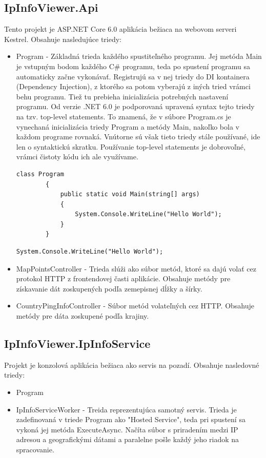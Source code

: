 \subsection{IpInfoViewer.Api}
Tento projekt je ASP.NET Core 6.0 aplikácia bežiaca na webovom serveri Kestrel. Obsahuje nasledujúce triedy: 
\begin{itemize}
    \item Program
    - Základná trieda každého spustiteľného programu. Jej metóda Main je vstupným bodom každého C\# programu, teda po spustení programu sa automaticky 
    začne vykonávať. Registrujú sa v nej triedy do DI kontainera (Dependency Injection), z ktorého sa potom vyberajú z iných tried vrámci behu programu. 
    Tiež tu prebieha inicializácia potrebných nastavení programu. Od verzie .NET 6.0 je podporovaná upravená syntax tejto triedy na tzv. top-level statements. 
    To znamená, že v súbore Program.cs je vynechaná inicializácia triedy Program a metódy Main, nakoľko bola v každom 
    programe rovnaká. Vnútorne sú však tieto triedy stále používané, ide len o syntaktickú skratku. Používanie top-level statements 
    je dobrovoľné, vrámci čistoty kódu ich ale využívame.
    \begin{lstlisting}[language={[Sharp]C},caption={Ukážka kódu triedy Program bez použitia top-level statements},label=alg:Program_Old]
        class Program 
        {
            public static void Main(string[] args) 
            {
                System.Console.WriteLine("Hello World");
            }
        }
    \end{lstlisting}
    \begin{lstlisting}[language={[Sharp]C},caption={Ukážka kódu triedy Program s použitím top-level statements},label=alg:Program_New]
        System.Console.WriteLine("Hello World");
    \end{lstlisting}
    \item MapPointsController
    - Trieda slúži ako súbor metód, ktoré sa dajú volať cez protokol HTTP z frontendovej časti aplikácie. Obsahuje metódy pre získavanie 
    dát zoskupených podľa zemepisnej dĺžky a šírky.
    \item CountryPingInfoController
    - Súbor metód volateľných cez HTTP. Obsahuje metódy pre dáta zoskupené podľa krajiny.
\end{itemize}
\subsection{IpInfoViewer.IpInfoService}
Projekt je konzolová aplikácia bežiaca ako servis na pozadí. Obsahuje nasledovné triedy:
\begin{itemize}
    \item Program
    \item IpInfoServiceWorker
    - Treida reprezentujúca samotný servis. Trieda je zadefinovaná v triede Program ako "Hosted Service", teda pri spustení sa vykoná jej metóda ExecuteAsync. 
    Načíta súbor s priradením medzi IP adresou a geografickými dátami a paralelne pošle každý jeho riadok na spracovanie.
\end{itemize}
